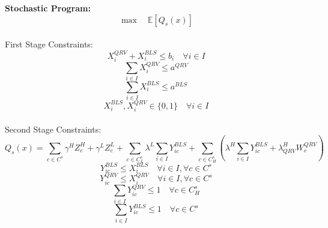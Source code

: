 \documentclass[12pt]{report}
\begin{document}
\pagebreak{}
\noindent\textbf{Stochastic Program:}
\begin{equation}
    \label{ObjectiveSP}
     \max \quad \mathbb{E}\left[ Q_s(x) \right]
\end{equation}
\\First Stage Constraints:
    \begin{equation}
        \label{assign to stations}
        X^{QRV}_{i} + X^{BLS}_{i} \leq b_{i} \quad \forall i \in I
    \end{equation}
     \begin{equation}
        \label{assign all QRVs}
        \sum_{ i \in I} X^{QRV}_{i} \leq a^{QRV} 
    \end{equation}
     \begin{equation}
        \label{assign all BLSs}
        \sum_{ i \in I} X^{BLS}_{i} \leq a^{BLS} 
    \end{equation}
    \begin{equation}
        \label{nonngegfirst}
        X^{BLS}_{i}, X^{QRV}_i \in \{0,1\} \quad \forall i \in I
    \end{equation}
\\Second Stage Constraints:
    \begin{equation}
        \label{SPfunc}
       Q_s(x) = \sum_{c \in C^s}\gamma^HZ^H_{c} + \gamma^LZ^L_{c} 
        + \sum_{c \in C^s_L}\lambda^L\sum_{i \in I} Y^{BLS}_{ic}
        + \sum_{c \in C^s_H}
       \left(
        \lambda^H\sum_{i \in I} Y^{BLS}_{ic} + 
        \lambda^H_{QRV}W^{QRV}_{c}
       \right)
    \end{equation}
    \begin{equation}
        \label{BLSloc}
        Y^{BLS}_{ic} \leq X^{BLS}_{i}  \quad  \forall i \in I, \forall c \in C^s
    \end{equation}
    \begin{equation}
        \label{QRVloc}
        Y^{QRV}_{ic} \leq X^{QRV}_{i}  \quad \forall i \in I, \forall c \in C^s
    \end{equation}
    \begin{equation}
        \label{Wpenalty}
        \sum_{i \in I} Y^{QRV}_{ic} \leq 1 \quad \forall c \in C^s_H
    \end{equation}
    \begin{equation}
        \label{Wpenalty}
    \sum_{i \in I} Y^{BLS}_{ic} \leq 1  \quad \forall c \in C^s 
    \end{equation}
\end{document}
